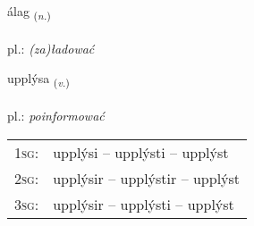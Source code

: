 \documentclass[frontgrid, backgrid]{flacards}\usepackage[]{graphicx}\usepackage[]{xcolor}
\begin{document}
{álag \small{\textsubscript{(\textit{n.})}} \\[1ex] %
\textphonetic{[auːlaɣ]} \\
pl.: \emph{(za)ładować} \\  [2ex]
\renewcommand*{\arraystretch}{0.8}
}

\renewcommand{\flhead}{\vskip5pt \fboxsep=0pt {\small\bfseries\footnotesize Sagnorð | Verb}}
\renewcommand{\fcfoot}{\vskip5pt \fboxsep=0pt \hspace{2pt}{\small\bfseries\footnotesize 2K}}

\renewcommand{\blhead}{\vskip5pt {\small\bfseries\footnotesize Sagnorð | Verb }}
\renewcommand{\bcfoot}{\vskip5pt \hspace{2pt}{\small\bfseries\footnotesize 2K}}


{upplýsa \small{\textsubscript{(\textit{v.})}} \\[1ex] %
\textphonetic{[ʏhplisa]} \\
pl.: \emph{poinformować} \\  [2ex]
\renewcommand*{\arraystretch}{0.8}
\begin{tabular}{p{1cm}l}
\textsc{1sg}: & upplýsi -- upplýsti -- upplýst \\ 
\textsc{2sg}: & upplýsir -- upplýstir -- upplýst \\ 
\textsc{3sg}: & upplýsir -- upplýsti -- upplýst \\ 
\end{tabular}
}

\renewcommand{\flhead}{\vskip5pt \fboxsep=0pt {\small\bfseries\footnotesize Nafnorð | Noun}}
\renewcommand{\fcfoot}{\vskip5pt \fboxsep=0pt \hspace{2pt}{\small\bfseries\footnotesize 2K}}
\end{document}

